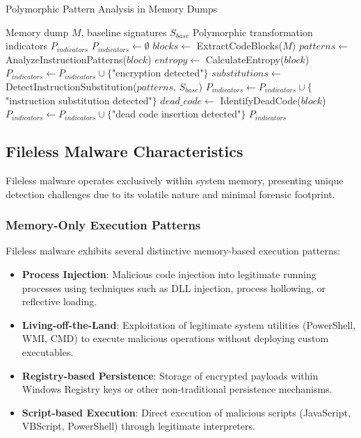 \begin{algorithm}[!htbp]
\caption{Polymorphic Pattern Analysis in Memory Dumps}
\label{alg:polymorphic-analysis}
\begin{algorithmic}[1]
\Require Memory dump $M$, baseline signatures $S_{base}$
\Ensure Polymorphic transformation indicators $P_{indicators}$
\State $P_{indicators} \leftarrow \emptyset$
\State $blocks \leftarrow$ ExtractCodeBlocks($M$)
    \State $patterns \leftarrow$ AnalyzeInstructionPatterns($block$)
    \State $entropy \leftarrow$ CalculateEntropy($block$)
        \State $P_{indicators} \leftarrow P_{indicators} \cup \{$"encryption detected"$\}$
    \EndIf
    \State $substitutions \leftarrow$ DetectInstructionSubstitution($patterns$, $S_{base}$)
        \State $P_{indicators} \leftarrow P_{indicators} \cup \{$"instruction substitution detected"$\}$
    \EndIf
    \State $dead\_code \leftarrow$ IdentifyDeadCode($block$)
        \State $P_{indicators} \leftarrow P_{indicators} \cup \{$"dead code insertion detected"$\}$
    \EndIf
\EndFor
\Return $P_{indicators}$
\end{algorithmic}
\end{algorithm}

\subsection{Fileless Malware Characteristics}
\label{subsec:fileless-characteristics}

Fileless malware operates exclusively within system memory, presenting unique detection challenges due to its volatile nature and minimal forensic footprint.

\subsubsection{Memory-Only Execution Patterns}

Fileless malware exhibits several distinctive memory-based execution patterns:

\begin{itemize}
    \item \textbf{Process Injection}: Malicious code injection into legitimate running processes using techniques such as DLL injection, process hollowing, or reflective loading.
    
    \item \textbf{Living-off-the-Land}: Exploitation of legitimate system utilities (PowerShell, WMI, CMD) to execute malicious operations without deploying custom executables.
    
    \item \textbf{Registry-based Persistence}: Storage of encrypted payloads within Windows Registry keys or other non-traditional persistence mechanisms.
    
    \item \textbf{Script-based Execution}: Direct execution of malicious scripts (JavaScript, VBScript, PowerShell) through legitimate interpreters.
\end{itemize}

